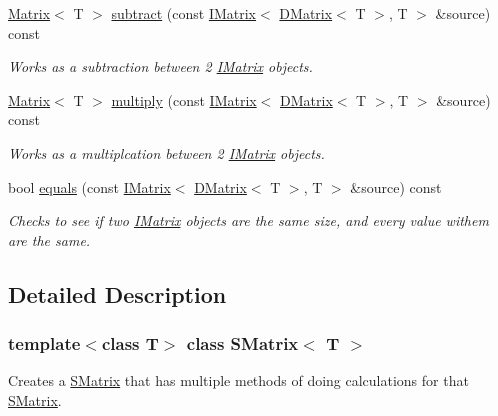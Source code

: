 \begin{DoxyCompactItemize}
\mbox{\hyperlink{class_matrix}{Matrix}}$<$ T $>$ \mbox{\hyperlink{class_s_matrix_a4fe3bb72a4fa1173189112fd33f3c887}{subtract}} (const \mbox{\hyperlink{class_i_matrix}{I\+Matrix}}$<$ \mbox{\hyperlink{class_d_matrix}{D\+Matrix}}$<$ T $>$, T $>$ \&source) const
\begin{DoxyCompactList}\small\item\em Works as a subtraction between 2 \mbox{\hyperlink{class_i_matrix}{I\+Matrix}} objects. \end{DoxyCompactList}\item 
\mbox{\hyperlink{class_matrix}{Matrix}}$<$ T $>$ \mbox{\hyperlink{class_s_matrix_a6c545e29bc68b553583d01f25c62e702}{multiply}} (const \mbox{\hyperlink{class_i_matrix}{I\+Matrix}}$<$ \mbox{\hyperlink{class_d_matrix}{D\+Matrix}}$<$ T $>$, T $>$ \&source) const
\begin{DoxyCompactList}\small\item\em Works as a multiplcation between 2 \mbox{\hyperlink{class_i_matrix}{I\+Matrix}} objects. \end{DoxyCompactList}\item 
bool \mbox{\hyperlink{class_s_matrix_a7d26cfada671d72f934ddd4acbc59e0b}{equals}} (const \mbox{\hyperlink{class_i_matrix}{I\+Matrix}}$<$ \mbox{\hyperlink{class_d_matrix}{D\+Matrix}}$<$ T $>$, T $>$ \&source) const
\begin{DoxyCompactList}\small\item\em Checks to see if two \mbox{\hyperlink{class_i_matrix}{I\+Matrix}} objects are the same size, and every value withem are the same. \end{DoxyCompactList}\end{DoxyCompactItemize}


\subsection{Detailed Description}
\subsubsection*{template$<$class T$>$\newline
class S\+Matrix$<$ T $>$}

Creates a \mbox{\hyperlink{class_s_matrix}{S\+Matrix}} that has multiple methods of doing calculations for that \mbox{\hyperlink{class_s_matrix}{S\+Matrix}}. 

